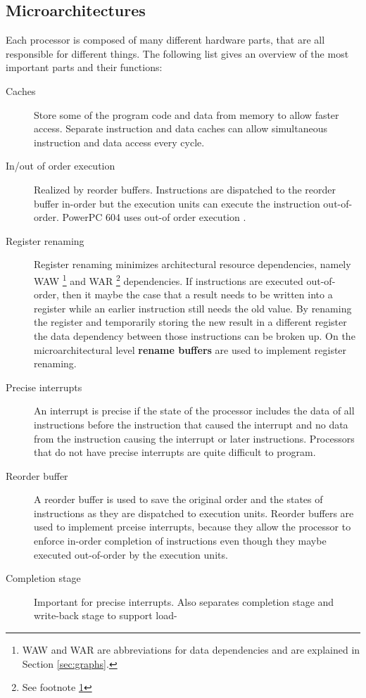 \documentclass[a4paper,10pt]{article}
\begin{document}
\subsection{Microarchitectures}
Each processor is composed of many different hardware parts, that are all responsible for different things. The following list gives an
overview of the most important parts and their functions:
\begin{description}
 \item[Caches] Store some of the program code and data from memory to allow faster access. Separate instruction and data caches
       can allow simultaneous instruction and data access every cycle.
 \item[In/out of order execution] Realized by reorder buffers. Instructions are dispatched to the reorder buffer in-order but
       the execution units can execute the instruction out-of-order. PowerPC 604 uses out-of order execution \cite{powerpc}.
 \item[Register renaming] Register renaming minimizes architectural resource dependencies, namely WAW
       \footnote{\label{footnote-waw}WAW and WAR are abbreviations for data dependencies and are explained in Section \ref{sec:graphs}.}
       and WAR \footnote{See footnote \ref{footnote-waw}} dependencies. If instructions are executed out-of-order, then it maybe the case
       that a result needs to be written into a register while an earlier instruction still needs the old value. By renaming the register
       and temporarily storing the new result in a different register the data dependency between those instructions can be broken up. On
       the microarchitectural level \textbf{rename buffers} are used to implement register renaming.
 \item[Precise interrupts] An interrupt is precise if the state of the processor includes the data of all instructions before
       the instruction that caused the interrupt and no data from the instruction causing the interrupt or later instructions. Processors
       that do not have precise interrupts are quite difficult to program\cite{powerpc}.
 \item[Reorder buffer] A reorder buffer is used to save the original order and the states of instructions as they are dispatched
       to execution units. Reorder buffers are used to implement prceise interrupts, because they allow the processor to enforce in-order
       completion of instructions even though they maybe executed out-of-order by the execution units.
 \item[Completion stage] Important for precise interrupts. Also separates completion stage and write-back stage to support load-

\end{description}
\end{document}
